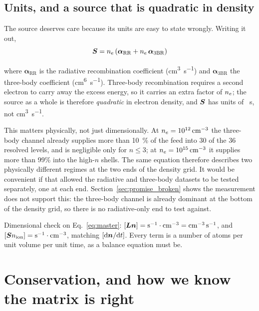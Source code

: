 \subsection{Units, and a source that is quadratic in density}
\label{sec:source_quadratic}

The source deserves care because its units are easy to state wrongly. Writing
it out,
\begin{equation}
  \bm{S} = n_e\left(\bm{\alpha}_{\mathrm{RR}}
        + n_e\,\bm{\alpha}_{\mathrm{3BR}}\right)
  \label{eq:source}
\end{equation}

\noindent where $\bm{\alpha}_{\mathrm{RR}}$ is the radiative recombination
coefficient (\si{\cubic\centi\metre\per\second}) and
$\bm{\alpha}_{\mathrm{3BR}}$ the three-body coefficient
(\si{\centi\metre\tothe{6}\per\second}). Three-body recombination requires a
second electron to carry away the excess energy, so it carries an extra factor
of $n_e$; the source as a whole is therefore \emph{quadratic} in electron
density, and $\bm{S}$ has units of \si{\per\second}, not
\si{\cubic\centi\metre\per\second}.

This matters physically, not just dimensionally. At $n_e = \SI{e12}{\per\cubic\centi\metre}$
the three-body channel already supplies more than \SI{10}{\percent} of the feed
into $30$ of the $36$ resolved levels, and is negligible only for $n \le 3$; at
$n_e = \SI{e15}{\per\cubic\centi\metre}$ it supplies more than 99\% into the
high-$n$ shells. The same equation therefore describes two physically different
regimes at the two ends of the density grid. It would be convenient if that
allowed the radiative and three-body datasets to be tested separately, one at
each end. Section~\ref{sec:promise_broken} shows the measurement does not
support this: the three-body channel is already dominant at the bottom of the
density grid, so there is no radiative-only end to test against.

Dimensional check on Eq.~\eqref{eq:master}: $[\bm{L}\bm{n}] =
\si{\per\second}\cdot\si{\per\cubic\centi\metre} =
\si{\per\cubic\centi\metre\per\second}$, and
$[\bm{S}n_{\mathrm{ion}}] = \si{\per\second}\cdot\si{\per\cubic\centi\metre}$, matching
$[\mathrm{d}\bm{n}/\mathrm{d}t]$. Every term is a number of atoms per unit volume
per unit time, as a balance equation must be.

\section{Conservation, and how we know the matrix is right}
\label{sec:conservation}

